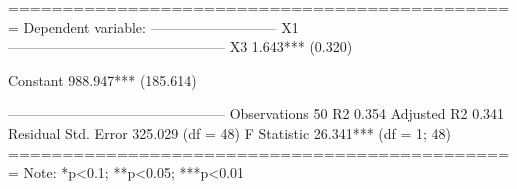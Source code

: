 
===============================================
                        Dependent variable:    
                    ---------------------------
                                X1             
-----------------------------------------------
X3                           1.643***          
                              (0.320)          
                                               
Constant                    988.947***         
                             (185.614)         
                                               
-----------------------------------------------
Observations                    50             
R2                             0.354           
Adjusted R2                    0.341           
Residual Std. Error      325.029 (df = 48)     
F Statistic           26.341*** (df = 1; 48)   
===============================================
Note:               *p<0.1; **p<0.05; ***p<0.01
